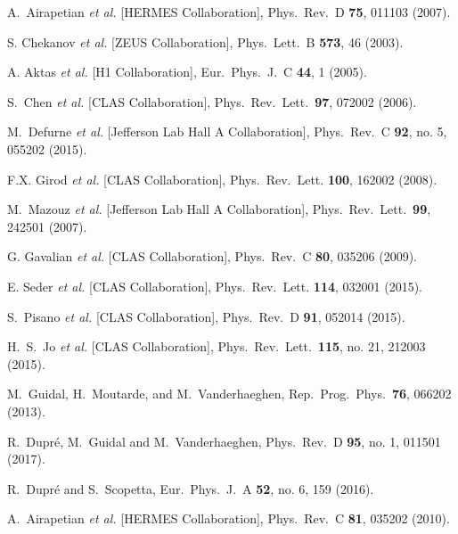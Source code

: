 \documentclass[twocolumn,nofootinbib,showpacs,prl,superscriptaddress,secnumarabic,amssymb,nobibnotes,aps,floatfix]{revtex4}
\begin{document}
\begin{thebibliography}{99}
 A.~Airapetian {\it et al.} [HERMES Collaboration],
Phys.\ Rev.\ D {\bf 75}, 011103 (2007).

S. Chekanov {\it et al.} [ZEUS Collaboration],
Phys.\ Lett.\  B {\bf 573}, 46 (2003).

A. Aktas {\it et al.} [H1 Collaboration],
Eur.\ Phys.\ J.\ C {\bf 44}, 1 (2005).

S.~Chen {\it et al.} [CLAS Collaboration],
Phys.\ Rev.\ Lett.\ {\bf 97}, 072002 (2006).

M.~Defurne {\it et al.} [Jefferson Lab Hall A Collaboration],
  Phys.\ Rev.\ C {\bf 92}, no. 5, 055202 (2015).

F.X. Girod {\it et al.} [CLAS Collaboration],
Phys.\ Rev.\ Lett. {\bf 100}, 162002 (2008).

   M.~Mazouz {\it et al.} [Jefferson Lab Hall A Collaboration],
   Phys.\ Rev.\ Lett.\  {\bf 99}, 242501 (2007).

G. Gavalian {\it et al.} [CLAS Collaboration],
Phys.\ Rev.\ C {\bf 80}, 035206 (2009).

E. Seder {\it et al.} [CLAS Collaboration],
Phys.\ Rev.\ Lett. {\bf 114}, 032001 (2015).

S.~Pisano {\it et al.} [CLAS Collaboration],
Phys.\ Rev.\ D {\bf 91}, 052014 (2015).

 H.~S.~Jo {\it et al.} [CLAS Collaboration],
  Phys.\ Rev.\ Lett.\  {\bf 115}, no. 21, 212003 (2015).

 M.~Guidal, H.~Moutarde, and M.~Vanderhaeghen,
Rep.\ Prog.\ Phys.\  {\bf 76}, 066202 (2013).

 R.~Dupr\'{e}, M.~Guidal and M.~Vanderhaeghen,
 Phys.\ Rev.\ D {\bf 95}, no. 1, 011501 (2017).

  R.~Dupr\'e and S.~Scopetta,
  Eur.\ Phys.\ J.\ A {\bf 52}, no. 6, 159 (2016).

 A.~Airapetian {\it et al.} [HERMES Collaboration],
Phys.\ Rev.\ C {\bf 81}, 035202 (2010).


\end{thebibliography}
\end{document}
